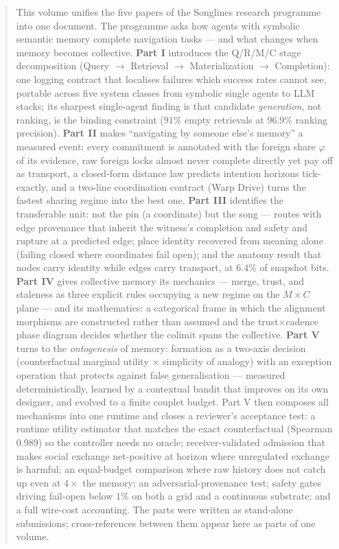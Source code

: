 \begin{abstract}
This volume unifies the five papers of the Songlines research
programme into one document. The programme asks how agents with
symbolic semantic memory complete navigation tasks --- and what
changes when memory becomes collective. \textbf{Part I} introduces the
Q/R/M/C stage decomposition (Query $\to$ Retrieval $\to$
Materialization $\to$ Completion): one logging contract that
localises failures which success rates cannot see, portable across
five system classes from symbolic single agents to LLM stacks; its
sharpest single-agent finding is that candidate \emph{generation},
not ranking, is the binding constraint ($91\%$ empty retrievals at
$96.9\%$ ranking precision). \textbf{Part II} makes ``navigating by
someone else's memory'' a measured event: every commitment is
annotated with the foreign share $\varphi$ of its evidence, raw
foreign locks almost never complete directly yet pay off as
transport, a closed-form distance law predicts intention horizons
tick-exactly, and a two-line coordination contract (Warp Drive) turns
the fastest sharing regime into the best one. \textbf{Part III}
identifies the transferable unit: not the pin (a coordinate) but the
song --- routes with edge provenance that inherit the witness's
completion and safety and rupture at a predicted edge; place identity
recovered from meaning alone (failing closed where coordinates fail
open); and the anatomy result that nodes carry identity while edges
carry transport, at $6.4\%$ of snapshot bits. \textbf{Part IV} gives
collective memory its mechanics --- merge, trust, and staleness as
three explicit rules occupying a new regime on the
$M{\times}C$ plane --- and its mathematics: a categorical frame in
which the alignment morphisms are constructed rather than assumed and
the trust$\times$cadence phase diagram decides whether the colimit
spans the collective. \textbf{Part V} turns to the
\emph{ontogenesis} of memory: formation as a two-axis decision
(counterfactual marginal utility $\times$ simplicity of analogy) with
an exception operation that protects against false generalisation ---
measured deterministically, learned by a contextual bandit that
improves on its own designer, and evolved to a finite couplet budget.
Part V then composes all mechanisms into one runtime and closes a
reviewer's acceptance test: a runtime utility estimator that matches
the exact counterfactual (Spearman $0.989$) so the controller needs
no oracle; receiver-validated admission that makes social exchange
net-positive at horizon where unregulated exchange is harmful; an
equal-budget comparison where raw history does not catch up even at
$4\times$ the memory; an adversarial-provenance test; safety gates
driving fail-open below $1\%$ on both a grid and a continuous
substrate; and a full wire-cost accounting. The parts were written as
stand-alone submissions; cross-references between them appear here as
parts of one volume.
\end{abstract}

